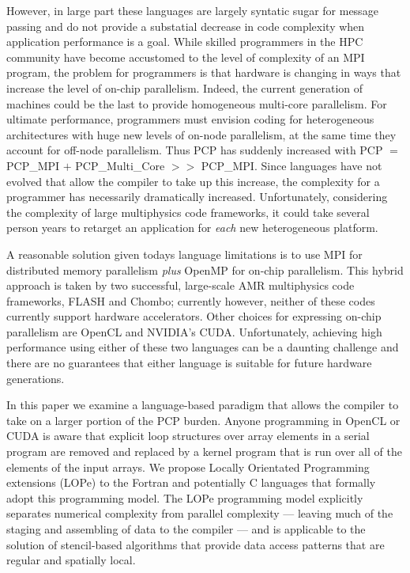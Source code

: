 However, in large part these languages are largely syntatic sugar for message passing and do not
provide a substatial decrease in code complexity when application performance is a
goal\cite{hasert:2011:EuroMPI}.  While skilled programmers in the HPC community have become
accustomed to the level of complexity of an MPI program,
the problem for programmers is that hardware is changing in ways that increase the level of on-chip
parallelism.  Indeed, the current generation of machines could be the last to provide homogeneous
multi-core parallelism\cite{JORSjors.aw}.  For ultimate performance, programmers must envision
coding for heterogeneous architectures 
with huge new levels of on-node parallelism, at the same time they account for off-node
parallelism.  Thus PCP has suddenly increased with PCP $=$ PCP\_MPI $+$ PCP\_Multi\_Core $>>$
PCP\_MPI.  Since languages have not evolved that allow the compiler to take up this increase, the
complexity for a programmer has necessarily dramatically increased.  Unfortunately, considering the
complexity of large multiphysics code frameworks, it could take several person years to retarget an
application for \emph{each} new heterogeneous platform\cite{DBLP:journals/corr/DubeyS13}.

A reasonable solution given todays language limitations is to use MPI for distributed memory
parallelism \emph{plus} OpenMP for on-chip parallelism.  This hybrid approach is taken by two
successful, large-scale AMR multiphysics code frameworks, FLASH and Chombo; currently however,
neither of these codes currently support hardware accelerators\cite{DBLP:journals/corr/DubeyS13}.
Other choices for expressing on-chip parallelism are OpenCL\cite{OPENCL} and NVIDIA's CUDA.
Unfortunately, achieving high performance using either of these two languages can be a daunting
challenge and there are no guarantees that either language is suitable for future hardware
generations.

In this paper we examine a language-based paradigm that allows the compiler to take on a larger
portion of the PCP burden.  Anyone programming in OpenCL or CUDA is aware that explicit loop
structures over array elements in a serial program are removed and replaced by a kernel program
that is run over all of the elements of the input arrays.  We propose Locally Orientated
Programming extensions (LOPe) to the Fortran and potentially C languages that formally adopt this
programming model.  The LOPe programming model explicitly separates numerical complexity from
parallel complexity --- leaving much of the staging and assembling of data to the compiler --- and
is applicable to the solution of stencil-based algorithms that provide data access patterns that
are regular and spatially local.

